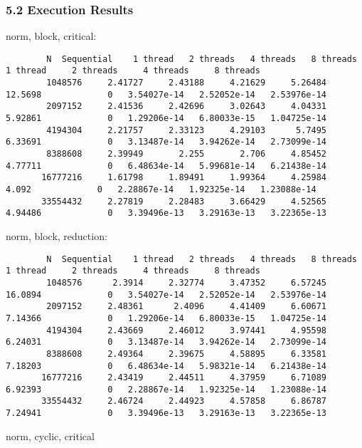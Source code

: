 \documentclass[]{article}
\begin{document}
    \subsubsection*{5.2 Execution Results}\label{5.2.appendix}
    norm, block, critical: 
    \begin{lstlisting}
        N  Sequential    1 thread   2 threads   4 threads   8 threads      1 thread     2 threads     4 threads     8 threads
        1048576     2.41727     2.43188     4.21629     5.26484     12.5698             0   3.54027e-14   2.52052e-14   2.53976e-14
        2097152     2.41536     2.42696     3.02643     4.04331     5.92861             0   1.29206e-14   6.80033e-15   1.04725e-14
        4194304     2.21757     2.33123     4.29103      5.7495     6.33691             0   3.13487e-14   3.94262e-14   2.73099e-14
        8388608     2.39949       2.255       2.706     4.85452     4.77711             0   6.48634e-14   5.99681e-14   6.21438e-14
       16777216     1.61798     1.89491     1.99364     4.25984       4.092             0   2.28867e-14   1.92325e-14   1.23088e-14
       33554432     2.27819     2.28483     3.66429     4.52565     4.94486             0   3.39496e-13   3.29163e-13   3.22365e-13
    \end{lstlisting}
    norm, block, reduction: 
    \begin{lstlisting}
        N  Sequential    1 thread   2 threads   4 threads   8 threads      1 thread     2 threads     4 threads     8 threads
        1048576      2.3914     2.32774     3.47352     6.57245     16.0894             0   3.54027e-14   2.52052e-14   2.53976e-14
        2097152     2.48361      2.4096     4.41409     6.60671     7.14366             0   1.29206e-14   6.80033e-15   1.04725e-14
        4194304     2.43669     2.46012     3.97441     4.95598     6.24031             0   3.13487e-14   3.94262e-14   2.73099e-14
        8388608     2.49364     2.39675     4.58895     6.33581     7.18203             0   6.48634e-14   5.98321e-14   6.21438e-14
       16777216     2.43419     2.44511     4.37959     6.71089     6.92393             0   2.28867e-14   1.92325e-14   1.23088e-14
       33554432     2.46724     2.44923     4.57858     6.86787     7.24941             0   3.39496e-13   3.29163e-13   3.22365e-13   
    \end{lstlisting}
    norm, cyclic, critical
\end{document}
